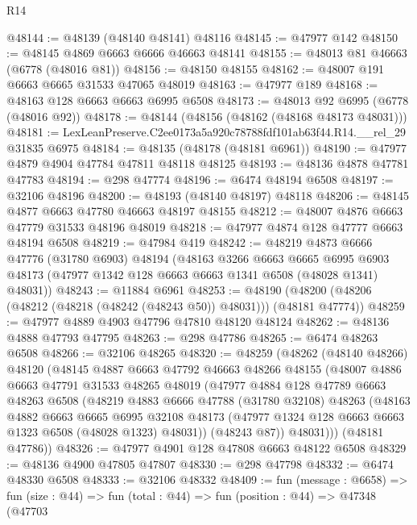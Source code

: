 \begin{lexlean}{R14}
\begin{coremodule}
@48144 := @48139 (@48140 @48141) @48116
@48145 := @47977 @142
@48150 := @48145 @4869 @6663 @6666 @46663 @48141
@48155 := @48013 @81 @46663 (@6778 (@48016 @81))
@48156 := @48150 @48155
@48162 := @48007 @191 @6663 @6665 @31533 @47065 @48019
@48163 := @47977 @189
@48168 := @48163 @128 @6663 @6663 @6995 @6508
@48173 := @48013 @92 @6995 (@6778 (@48016 @92))
@48178 := @48144 (@48156 (@48162 (@48168 @48173 @48031)))
@48181 := LexLeanPreserve.C2ee0173a5a920c78788fdf101ab63f44.R14.__rel_29 @31835 @6975
@48184 := @48135 (@48178 (@48181 @6961))
@48190 := @47977 @4879 @4904 @47784 @47811 @48118 @48125
@48193 := @48136 @4878 @47781 @47783
@48194 := @298 @47774
@48196 := @6474 @48194 @6508
@48197 := @32106 @48196
@48200 := @48193 (@48140 @48197) @48118
@48206 := @48145 @4877 @6663 @47780 @46663 @48197 @48155
@48212 := @48007 @4876 @6663 @47779 @31533 @48196 @48019
@48218 := @47977 @4874 @128 @47777 @6663 @48194 @6508
@48219 := @47984 @419
@48242 := @48219
    @4873
    @6666
    @47776
    (@31780 @6903)
    @48194
    (@48163
      @3266
      @6663
      @6665
      @6995
      @6903
      @48173
      (@47977 @1342 @128 @6663 @6663 @1341 @6508 (@48028 @1341) @48031))
@48243 := @11884 @6961
@48253 := @48190 (@48200 (@48206 (@48212 (@48218 (@48242 (@48243 @50)) @48031))) (@48181 @47774))
@48259 := @47977 @4889 @4903 @47796 @47810 @48120 @48124
@48262 := @48136 @4888 @47793 @47795
@48263 := @298 @47786
@48265 := @6474 @48263 @6508
@48266 := @32106 @48265
@48320 := @48259
    (@48262
      (@48140 @48266)
      @48120
      (@48145
        @4887
        @6663
        @47792
        @46663
        @48266
        @48155
        (@48007
          @4886
          @6663
          @47791
          @31533
          @48265
          @48019
          (@47977
            @4884
            @128
            @47789
            @6663
            @48263
            @6508
            (@48219
              @4883
              @6666
              @47788
              (@31780 @32108)
              @48263
              (@48163
                @4882
                @6663
                @6665
                @6995
                @32108
                @48173
                (@47977 @1324 @128 @6663 @6663 @1323 @6508 (@48028 @1323) @48031))
              (@48243 @87))
            @48031)))
      (@48181 @47786))
@48326 := @47977 @4901 @128 @47808 @6663 @48122 @6508
@48329 := @48136 @4900 @47805 @47807
@48330 := @298 @47798
@48332 := @6474 @48330 @6508
@48333 := @32106 @48332
@48409 := fun (message : @6658) =>
  fun (size : @44) =>
  fun (total : @44) =>
  fun (position : @44) =>
  @47348
    (@47703

\end{coremodule}
\end{lexlean}
